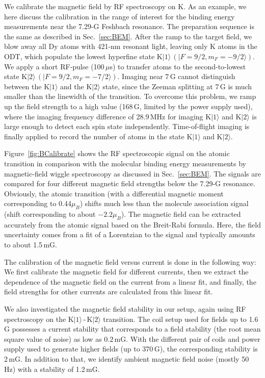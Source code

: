We calibrate the magnetic field by RF spectroscopy on K. As an example, we here discuss the calibration in the range of interest for the binding energy measurements near the 7.29-G Feshbach resonance. The preparation sequence is the same as described in Sec.~\ref{sec:BEM}. After the ramp to the target field, we blow away all Dy atoms with 421-nm resonant light, leaving only K atoms in the ODT, which populate the lowest hyperfine state K$|1\rangle\,(|F=9/2,m_F=-9/2\rangle)$. We apply a short RF-pulse (100\,$\mu$s) to transfer atoms to the second-to-lowest state K$|2\rangle\,(|F=9/2,m_F=-7/2\rangle)$. Imaging near 7\,G cannot distinguish between the K$|1\rangle$ and the K$|2\rangle$ state, since the Zeeman splitting at 7\,G is much smaller than the linewidth of the transition. To overcome this problem, we ramp up the field strength to a high value (168\,G, limited by the power supply used), where the imaging frequency difference of 28.9\,MHz for imaging K$|1\rangle$ and K$|2\rangle$ is large enough to detect each spin state independently. Time-of-flight imaging is finally applied to record the number of atoms in the state K$|1\rangle$ and K$|2\rangle$.

Figure~\ref{fig:BCalibrate} shows the RF spectroscopic signal on the atomic transition in comparison with the molecular binding energy measurements by magnetic-field wiggle spectroscopy as discussed in Sec.~\ref{sec:BEM}. The signals are compared for four different magnetic field strengths below the 7.29-G resonance. Obviously, the atomic transition (with a differential magnetic moment corresponding to 0.44$\mu_B$) shifts much less than the molecule association signal (shift corresponding to about $-2.2\mu_B$). The magnetic field can be extracted accurately from the atomic signal based on the Breit-Rabi formula. Here, the field uncertainty comes from a fit of a Lorentzian to the signal and typically amounts to about 1.5\,mG.

The calibration of the magnetic field versus current is done in the following way: We first calibrate the magnetic field for different currents, then we extract the dependence of the magnetic field on the current from a linear fit, and finally, the field strengths for other currents are calculated from this linear fit.

We also investigated the magnetic field stability in our setup, again using RF spectroscopy on the K$|1\rangle$\,-\,K$|2\rangle$ transition. The coil setup used for fields up to 1.6\,G possesses a current stability that corresponds to a field stability (the root mean square value of noise) as low as $0.2$\,mG. With the different pair of coils and power supply used to generate higher fields (up to 370\,G), the corresponding stability is 2\,mG. In addition to that, we identify ambient magnetic field noise (mostly 50\,Hz) with a stability of 1.2\,mG. 